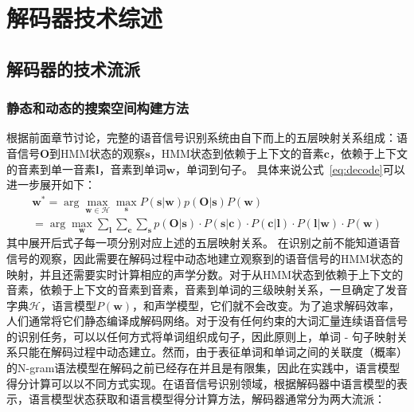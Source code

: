 \section{解码器技术综述}
\label{chap:intro2-dec-sum}

\subsection{解码器的技术流派}
\label{chap:intro-lvcsr-decmethod}

\subsubsection{静态和动态的搜索空间构建方法}
\label{chap:intro-lvcsr-decmethod-graph}

根据前面章节讨论，完整的语音信号识别系统由自下而上的五层映射关系组成：语音信号$\mathbf{O}$到HMM状态的观察$\mathbf{s}$，HMM状态到依赖于上下文的音素$\mathbf{c}$，依赖于上下文的音素到单一音素$\mathbf{l}$，音素到单词$\mathbf{w}$，单词到句子。
具体来说公式~\ref{eq:decode}可以进一步展开如下：
\begin{equation}
 \begin{split}
\label{eq:decode-sp}
\mathbf{w}^* = \arg \max_{\mathbf{w} \in \mathcal{H}} \max_{\mathbf{s}} P(\mathbf{s}|\mathbf{w})p(\mathbf{O}|\mathbf{s})P(\mathbf{w}) \\
= \arg \max_{\mathbf{w}} \sum_{\mathbf{l}} \sum_{\mathbf{c}} \sum_{\mathbf{s}}
p(\mathbf{O}|\mathbf{s}) \cdot
P(\mathbf{s}|\mathbf{c})\cdot P(\mathbf{c}|\mathbf{l})\cdot P(\mathbf{l}|\mathbf{w}) \cdot 
P(\mathbf{w})
 \end{split}
\end{equation}
其中展开后式子每一项分别对应上述的五层映射关系。
在识别之前不能知道语音信号的观察，因此需要在解码过程中动态地建立观察到的语音信号的HMM状态的映射，并且还需要实时计算相应的声学分数。对于从HMM状态到依赖于上下文的音素，依赖于上下文的音素到音素，音素到单词的三级映射关系，一旦确定了发音字典$\mathcal{H}$，语言模型$P(\mathbf{w})$，和声学模型，它们就不会改变。为了追求解码效率，人们通常将它们静态编译成解码网络。对于没有任何约束的大词汇量连续语音信号的识别任务，可以以任何方式将单词组织成句子，因此原则上，单词 - 句子映射关系只能在解码过程中动态建立。然而，由于表征单词和单词之间的关联度（概率）的N-gram语法模型在解码之前已经存在并且是有限集，因此在实践中，语言模型得分计算可以以不同方式实现。在语音信号识别领域，根据解码器中语言模型的表示，语言模型状态获取和语言模型得分计算方法，解码器通常分为两大流派：
